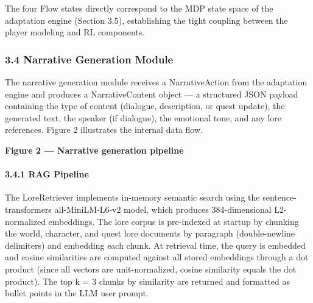 The four Flow states directly correspond to the MDP state space of the
adaptation engine (Section 3.5), establishing the tight coupling between
the player modeling and RL components.

\subsubsection{3.4 Narrative Generation
Module}\label{narrative-generation-module}

The narrative generation module receives a NarrativeAction from the
adaptation engine and produces a NarrativeContent object --- a
structured JSON payload containing the type of content (dialogue,
description, or quest update), the generated text, the speaker (if
dialogue), the emotional tone, and any lore references. Figure 2
illustrates the internal data flow.

\begin{Shaded}
\begin{Highlighting}[]
\end{Highlighting}
\end{Shaded}

\textbf{Figure 2 --- Narrative generation pipeline}

\paragraph{3.4.1 RAG Pipeline}\label{rag-pipeline}

The LoreRetriever implements in-memory semantic search using the
sentence-transformers all-MiniLM-L6-v2 model, which produces
384-dimensional L2-normalized embeddings. The lore corpus is pre-indexed
at startup by chunking the world, character, and quest lore documents by
paragraph (double-newline delimiters) and embedding each chunk. At
retrieval time, the query is embedded and cosine similarities are
computed against all stored embeddings through a dot product (since all
vectors are unit-normalized, cosine similarity equals the dot product).
The top k = 3 chunks by similarity are returned and formatted as bullet
points in the LLM user prompt.

